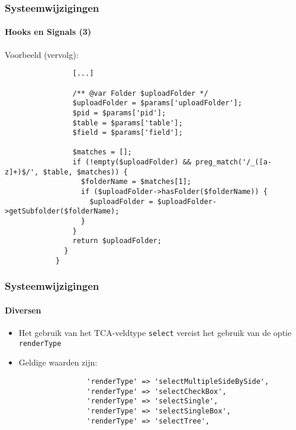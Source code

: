 \begin{frame}[fragile]
	\frametitle{Systeemwijzigingen}
	\framesubtitle{Hooks en Signals (3)}

	\lstset{basicstyle=\tiny\ttfamily}

	\small Voorbeeld (vervolg):\normalsize

		\begin{lstlisting}
			    [...]

			    /** @var Folder $uploadFolder */
			    $uploadFolder = $params['uploadFolder'];
			    $pid = $params['pid'];
			    $table = $params['table'];
			    $field = $params['field'];

			    $matches = [];
			    if (!empty($uploadFolder) && preg_match('/_([a-z]+)$/', $table, $matches)) {
			      $folderName = $matches[1];
			      if ($uploadFolder->hasFolder($folderName)) {
			        $uploadFolder = $uploadFolder->getSubfolder($folderName);
			      }
			    }
			    return $uploadFolder;
			  }
			}
		\end{lstlisting}

\end{frame}

\begin{frame}[fragile]
	\frametitle{Systeemwijzigingen}
	\framesubtitle{Diversen}

	\begin{itemize}

		\item Het gebruik van het TCA-veldtype \texttt{select} vereist het gebruik van de optie \texttt{renderType}

		\item Geldige waarden zijn:

			\begin{lstlisting}
				'renderType' => 'selectMultipleSideBySide',
				'renderType' => 'selectCheckBox',
				'renderType' => 'selectSingle',
				'renderType' => 'selectSingleBox',
				'renderType' => 'selectTree',
			\end{lstlisting}

	\end{itemize}

\end{frame}

